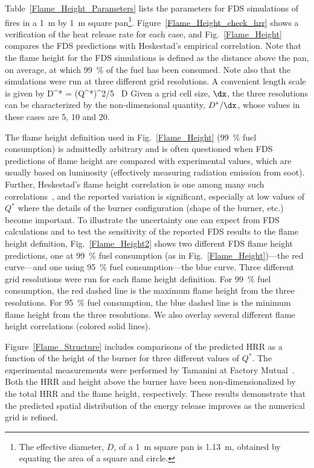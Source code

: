 Table~\ref{Flame_Height_Parameters} lists the parameters for FDS simulations of fires in a 1~m by 1~m square pan\footnote{The effective diameter, $D$, of a 1~m square pan is 1.13~m, obtained by equating the area of a square and circle.}. Figure~\ref{Flame_Height_check_hrr} shows a verification of the heat release rate for each case, and Fig.~\ref{Flame_Height} compares the FDS predictions with Heskestad's empirical correlation. Note that the flame height for the FDS simulations is defined as the distance above the pan, on average, at which 99~\% of the fuel has been consumed. Note also that the simulations were run at three different grid resolutions. A convenient length scale is given by
\be
   D^* = (Q^*)^{2/5} \, D
\ee
Given a grid cell size, $\dx$, the three resolutions can be characterized by the non-dimensional quantity, $D^*/\dx$, whose values in these cases are 5, 10 and 20.

The flame height definition used in Fig.~\ref{Flame_Height} (99~\% fuel consumption) is admittedly arbitrary and is often questioned when FDS predictions of flame height are compared with experimental values, which are usually based on luminosity (effectively measuring radiation emission from soot).  Further, Heskestad's flame height correlation is one among many such correlations~\cite{SFPE:Heskestad,Steward:1970,Becker:1978,Cox:1985,Hasemi:1984,Cetegen:1984,Delichatsios:1984}, and the reported variation is significant, especially at low values of $Q^*$ where the details of the burner configuration (shape of the burner, etc.) become important.  To illustrate the uncertainty one can expect from FDS calculations and to test the sensitivity of the reported FDS results to the flame height definition, Fig.~\ref{Flame_Height2} shows two different FDS flame height predictions, one at 99~\% fuel consumption (as in Fig.~\ref{Flame_Height})---the red curve---and one using 95~\% fuel consumption---the blue curve.  Three different grid resolutions were run for each flame height definition.  For 99~\% fuel consumption, the red dashed line is the maximum flame height from the three resolutions.  For 95~\% fuel consumption, the blue dashed line is the minimum flame height from the three resolutions.  We also overlay several different flame height correlations (colored solid lines).

Figure~\ref{Flame_Structure} includes comparisons of the predicted HRR as a function of the height of the burner for three different values of $Q^*$. The experimental measurements were performed by Tamanini at Factory Mutual~\cite{Tamanini:CF1983}. Both the HRR and height above the burner have been non-dimensionalized by the total HRR and the flame height, respectively. These results demonstrate that the predicted spatial distribution of the energy release improves as the numerical grid is refined.

